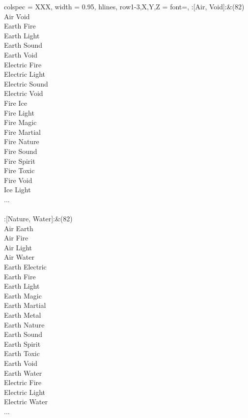 \begin{longtblr}[
	caption = {2v2 Defending Weak},
	label = {2v2-Defending-Weak},
]{
	colspec = {XXX}, width = 0.95\linewidth,
	hlines,
	row{1-3,X,Y,Z} = {font=\bfseries},
}
	:[Air, Void]:&{(82)\\
	Air Void \\
	Earth Fire \\
	Earth Light \\
	Earth Sound \\
	Earth Void \\
	Electric Fire \\
	Electric Light \\
	Electric Sound \\
	Electric Void \\
	Fire Ice \\
	Fire Light \\
	Fire Magic \\
	Fire Martial \\
	Fire Nature \\
	Fire Sound \\
	Fire Spirit \\
	Fire Toxic \\
	Fire Void \\
	Ice Light \\
	...\\
	}\\

	:[Nature, Water]:&{(82)\\
	Air Earth \\
	Air Fire \\
	Air Light \\
	Air Water \\
	Earth Electric \\
	Earth Fire \\
	Earth Light \\
	Earth Magic \\
	Earth Martial \\
	Earth Metal \\
	Earth Nature \\
	Earth Sound \\
	Earth Spirit \\
	Earth Toxic \\
	Earth Void \\
	Earth Water \\
	Electric Fire \\
	Electric Light \\
	Electric Water \\
	...\\
	}\\


\end{longtblr}
